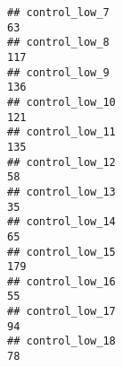 \documentclass[
]{article}
\begin{document}
\begin{verbatim}
## control_low_7                                                                                                                                                                                                               63
## control_low_8                                                                                                                                                                                                              117
## control_low_9                                                                                                                                                                                                              136
## control_low_10                                                                                                                                                                                                             121
## control_low_11                                                                                                                                                                                                             135
## control_low_12                                                                                                                                                                                                              58
## control_low_13                                                                                                                                                                                                              35
## control_low_14                                                                                                                                                                                                              65
## control_low_15                                                                                                                                                                                                             179
## control_low_16                                                                                                                                                                                                              55
## control_low_17                                                                                                                                                                                                              94
## control_low_18                                                                                                                                                                                                              78

\end{verbatim}
\end{document}
